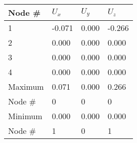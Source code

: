 \documentclass{article}
\begin{document}
    \begin{table}
    \centering
    \begin{tabular}{@{} l l l l @{}}
    \toprule
    Node \# & $U_x$ & $U_y$ & $U_z$\\
    \midrule

1 & -0.071 &  0.000 & -0.266 \\
2 &  0.000 &  0.000 &  0.000 \\
3 &  0.000 &  0.000 &  0.000 \\
4 &  0.000 &  0.000 &  0.000 \\
Maximum &  0.071 &  0.000 &  0.266 \\
Node \# & 0 & 0 & 0 \\
Minimum &  0.000 &  0.000 &  0.000 \\
Node \# & 1 & 0 & 1 \\

    \bottomrule
\end{tabular}
    \end{table}
    
\end{document}
